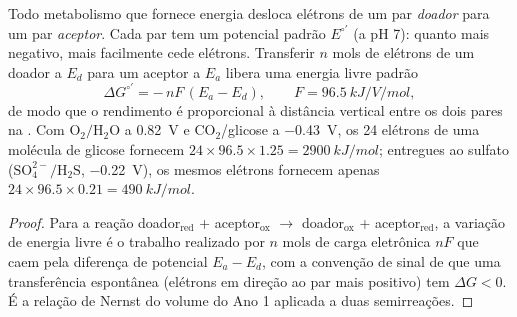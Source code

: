\begin{theorem}\label{thm:b2:microbial-metabolism:redox}
Todo metabolismo que fornece energia desloca elétrons de um par
\emph{doador} para um par \emph{aceptor}. Cada par tem um potencial
padrão $E^{\circ\prime}$ (a pH 7): quanto mais negativo, mais
facilmente cede elétrons. Transferir $n$ mols de elétrons de um doador
a $E_d$ para um aceptor a $E_a$ libera uma energia livre padrão
\[
\Delta G^{\circ\prime} = -\,n F\,(E_a - E_d), \qquad F = \qty{96.5}{kJ/V/mol},
\]
de modo que o rendimento é proporcional à distância vertical entre os
dois pares na \emph{}. Com
$\mathrm{O_2/H_2O}$ a \qty{+0.82}{V} e $\mathrm{CO_2}$/glicose a
\qty{-0.43}{V}, os 24 elétrons de uma molécula de glicose fornecem
$24\times 96.5\times 1.25 = \qty{2900}{kJ/mol}$; entregues ao sulfato
($\mathrm{SO_4^{2-}/H_2S}$, \qty{-0.22}{V}), os mesmos elétrons
fornecem apenas $24\times 96.5\times 0.21 = \qty{490}{kJ/mol}$.
\end{theorem}
\begin{proof}
Para a reação doador$_{\text{red}}$ + aceptor$_{\text{ox}}$
$\to$ doador$_{\text{ox}}$ + aceptor$_{\text{red}}$, a variação de
energia livre é o trabalho realizado por $n$ mols de carga eletrônica
$nF$ que caem pela diferença de potencial $E_a - E_d$, com a convenção
de sinal de que uma transferência espontânea (elétrons em direção ao
par mais positivo) tem $\Delta G < 0$. É a relação de Nernst do volume
do Ano 1 aplicada a duas semirreações.
\end{proof}

